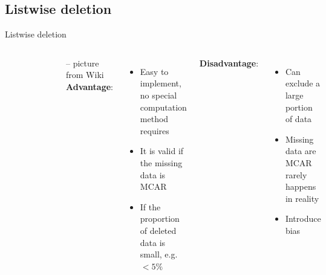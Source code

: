 \documentclass{beamer}
\begin{document}
\subsection{Listwise deletion}
\begin{frame}{Listwise deletion}
\begin{columns}[c] 
	
\begin{figure}[h!]
	\includegraphics[width=\textwidth]{listwise.png}
\end{figure}
-- picture from Wiki
\textbf{Advantage}:\\
\begin{itemize}
\item{Easy to implement, no special computation method requires}
\item{It is valid if the missing data is MCAR}
\item{If the proportion of deleted data is small, e.g. $<5\%$}
\end{itemize}
\textbf{Disadvantage}:\\
\begin{itemize}
	\item{Can exclude a large portion of data}
	\item{Missing data are MCAR rarely happens in reality}
	\item{Introduce bias}
\end{itemize}
\end{columns}


\end{frame}
\end{document}
